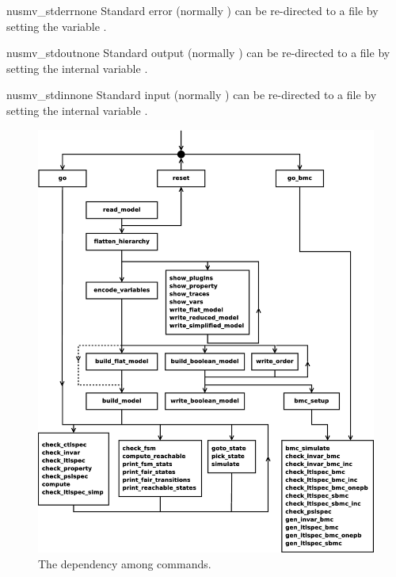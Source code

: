 \begin{nusmvVar} {nusmv\_stderr}{}{none}
Standard error (normally ) can be re-directed to a file
by setting the variable .
\end{nusmvVar}

\begin{nusmvVar} {nusmv\_stdout}{}{none}
Standard output (normally ) can be re-directed to a file
by setting the internal variable .
\end{nusmvVar}

\begin{nusmvVar} {nusmv\_stdin}{}{none}
Standard input (normally ) can be re-directed to a file
by setting the internal variable .
\end{nusmvVar}

\begin{figure}[t]
\label{flowchart}
\begin{center}
\includegraphics[width=\textwidth]{cmdpo}
\caption{The dependency among \nusmv commands.}
\end{center}
\end{figure}
